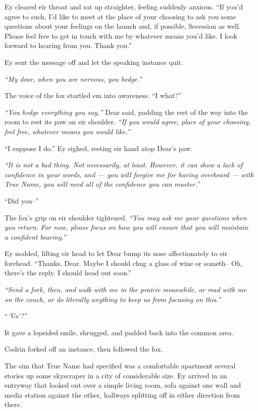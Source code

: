 Ey cleared eir throat and sat up straighter, feeling suddenly anxious. ``If you'd agree to such, I'd like to meet at the place of your choosing to ask you some questions about your feelings on the launch and, if possible, Secession as well. Please feel free to get in touch with me by whatever means you'd like. I look forward to hearing from you. Thank you.''

Ey sent the message off and let the speaking instance quit.

\emph{``My dear, when you are nervous, you hedge.''}

The voice of the fox startled em into awareness. ``I what?''

\emph{``You hedge everything you say,''} Dear said, padding the rest of the way into the room to rest its paw on eir shoulder. \emph{``If you would agree, place of your choosing, feel free, whatever means you would like.''}

``I suppose I do.'' Ey sighed, resting eir hand atop Dear's paw.

\emph{``It is not a bad thing. Not necessarily, at least. However, it can show a lack of confidence in your words, and — you will forgive me for having overheard — with True Name, you will need all of the confidence you can muster.''}

``Did you--''

The fox's grip on eir shoulder tightened. \emph{``You may ask me your questions when you return. For now, please focus on how you will ensure that you will maintain a confident bearing.''}

Ey nodded, lifting eir head to let Dear bump its nose affectionately to eir forehead. ``Thanks, Dear. Maybe I should chug a glass of wine or someth-- Oh, there's the reply. I should head out soon.''

\emph{``Send a fork, then, and walk with me in the prairie meanwhile, or read with me on the couch, or do literally anything to keep us from focusing on this.''}

``\,`Us'?''

It gave a lopsided smile, shrugged, and padded back into the common area.

Codrin forked off an instance, then followed the fox.

The sim that True Name had specified was a comfortable apartment several stories up some skyscraper in a city of considerable size. Ey arrived in an entryway that looked out over a simple living room, sofa against one wall and media station against the other, hallways splitting off in either direction from there.

